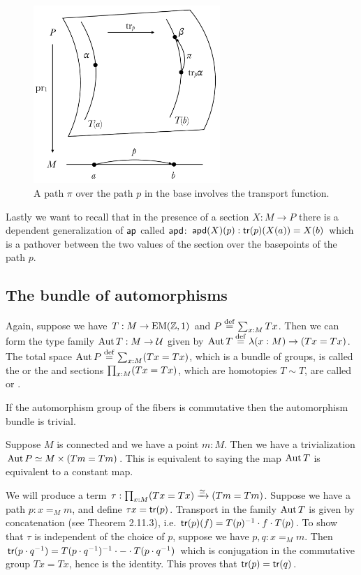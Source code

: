 \begin{figure}[H]
\centering
\includegraphics[width=200pt]{figs/pathovers.pdf}
\caption{A path \( \pi \) over the path \( p \) in the base involves the transport function.}
\label{fig:pathovers}
\end{figure}

Lastly we want to recall that in the presence of a section \( X:M\to P \) there is a dependent generalization of \( \mathsf{ap} \) called \( \mathsf{apd} \): \( \mathsf{apd}(X)(p):\mathsf{tr}(p)(X(a))=X(b) \) which is a pathover between the two values of the section over the basepoints of the path \( p \).

\subsection{The bundle of automorphisms}
\label{sec:automorphisms}
\begin{mydef}
Again, suppose we have \( T:M\to\mathrm{EM}(\mathbb{Z},1) \) and \( P\stackrel{\mathrm{def}}{=}\sum_{x:M}Tx \). Then we can form the type family \( \operatorname{Aut} T:M\to\mathcal{U} \) given by \( \operatorname{Aut} T\stackrel{\mathrm{def}}{=}\lambda(x:M)\to (Tx=Tx) \). The total space \( \operatorname{Aut} P\stackrel{\mathrm{def}}{=}\sum_{x:M}(Tx=Tx) \), which is a bundle of groups, is called the  or the  and sections \( \prod_{x:M}(Tx=Tx) \), which are homotopies \( T\sim T \), are called  or .
\end{mydef}

If the automorphism group of the fibers is commutative then the automorphism bundle is trivial.

\begin{mylemma}
\label{lem:gauge_triv}
Suppose \( M \) is connected and we have a point \( m:M \). Then we have a trivialization \( \operatorname{Aut} P\simeq M\times (Tm=Tm) \). This is equivalent to saying the map \( \operatorname{Aut} T \) is equivalent to a constant map.
\end{mylemma}
\begin{myproof}
We will produce a term \( \tau:\prod_{x:M}(Tx=Tx)\xrightarrow[]{\simeq}(Tm=Tm) \). Suppose we have a path \( p:x=_M m \), and define \( \tau x=\mathsf{tr}(p) \). Transport in the family \( \operatorname{Aut} T \) is given by concatenation (see \cite{hottbook} Theorem 2.11.3), i.e. \( \mathsf{tr}(p)(f)=T(p)^{-1}\cdot f\cdot T(p) \). To show that \( \tau \) is independent of the choice of \( p \), suppose we have \( p,q:x=_M m \). Then \( \mathsf{tr}(p\cdot q^{-1})=T(p\cdot q^{-1})^{-1}\cdot -\cdot T(p\cdot q^{-1}) \) which is conjugation in the commutative group \( Tx=Tx \), hence is the identity. This proves that \( \mathsf{tr}(p)=\mathsf{tr}(q) \).
\end{myproof}
